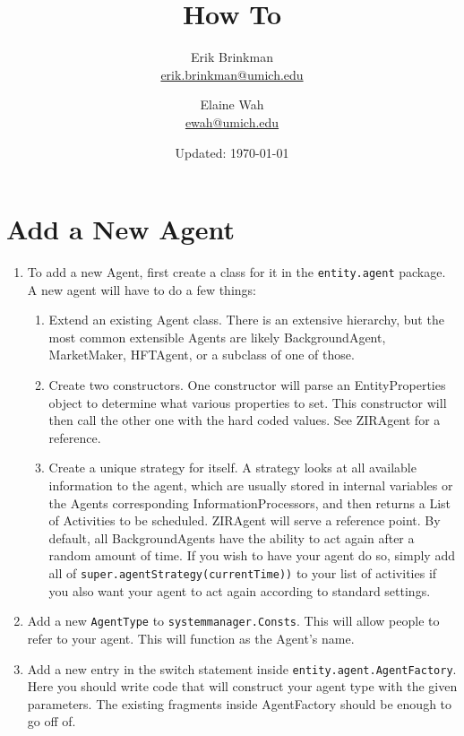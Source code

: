 \documentclass[11pt]{article}
\begin{document}
	
\title{How To}
\author{
  Erik Brinkman \\
  \href{mailto:erik.brinkman@umich.edu}{erik.brinkman@umich.edu}
  \and
  Elaine Wah \\
  \href{mailto:ewah@umich.edu}{ewah@umich.edu}
}
\date{Updated: \today}
\maketitle

\tableofcontents

\section{Add a New Agent}

\begin{enumerate}[1)]
\item To add a new Agent, first create a class for it in the
  \texttt{entity.agent} package. A new agent will have to do a few things:
  \begin{enumerate}[1.]
  \item Extend an existing Agent class. There is an extensive hierarchy, but the
    most common extensible Agents are likely BackgroundAgent, MarketMaker,
    HFTAgent, or a subclass of one of those.
  \item Create two constructors. One constructor will parse an EntityProperties
    object to determine what various properties to set. This constructor will
    then call the other one with the hard coded values. See ZIRAgent for a
    reference.
  \item Create a unique strategy for itself. A strategy looks at all available
    information to the agent, which are usually stored in internal variables or
    the Agents corresponding InformationProcessors, and then returns a List of
    Activities to be scheduled. ZIRAgent will serve a reference point. By
    default, all BackgroundAgents have the ability to act again after a random
    amount of time. If you wish to have your agent do so, simply add all of
    \texttt{super.agentStrategy(currentTime))} to your list of activities if you
    also want your agent to act again according to standard settings.
  \end{enumerate}
\item Add a new \texttt{AgentType} to \texttt{systemmanager.Consts}. This will
  allow people to refer to your agent. This will function as the Agent's name.
\item Add a new entry in the switch statement inside
  \texttt{entity.agent.AgentFactory}. Here you should write code that will
  construct your agent type with the given parameters. The existing fragments
  inside AgentFactory should be enough to go off of.
\end{enumerate}
\end{document}
